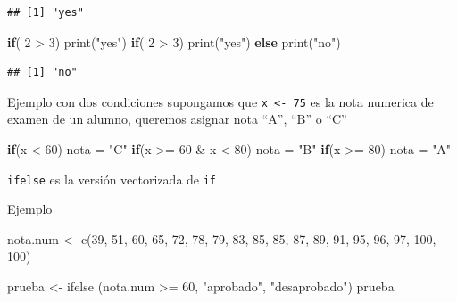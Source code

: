 \documentclass[
]{book}
\newenvironment{Shaded}{\begin{snugshade}}{\end{snugshade}}
\newcommand{\ControlFlowTok}[1]{\textcolor[rgb]{0.13,0.29,0.53}{\textbf{#1}}}
\newcommand{\DecValTok}[1]{\textcolor[rgb]{0.00,0.00,0.81}{#1}}
\newcommand{\FunctionTok}[1]{\textcolor[rgb]{0.00,0.00,0.00}{#1}}
\newcommand{\NormalTok}[1]{#1}
\newcommand{\OtherTok}[1]{\textcolor[rgb]{0.56,0.35,0.01}{#1}}
\newcommand{\SpecialCharTok}[1]{\textcolor[rgb]{0.00,0.00,0.00}{#1}}
\newcommand{\StringTok}[1]{\textcolor[rgb]{0.31,0.60,0.02}{#1}}
\begin{document}
\begin{verbatim}
## [1] "yes"
\end{verbatim}

\begin{Shaded}
\begin{Highlighting}[]
\ControlFlowTok{if}\NormalTok{( }\DecValTok{2} \SpecialCharTok{\textgreater{}} \DecValTok{3}\NormalTok{) }\FunctionTok{print}\NormalTok{(}\StringTok{"yes"}\NormalTok{)}
\ControlFlowTok{if}\NormalTok{( }\DecValTok{2} \SpecialCharTok{\textgreater{}} \DecValTok{3}\NormalTok{) }\FunctionTok{print}\NormalTok{(}\StringTok{"yes"}\NormalTok{) }\ControlFlowTok{else} \FunctionTok{print}\NormalTok{(}\StringTok{"no"}\NormalTok{)}
\end{Highlighting}
\end{Shaded}

\begin{verbatim}
## [1] "no"
\end{verbatim}

Ejemplo con dos condiciones
supongamos que \texttt{x\ \textless{}-\ 75} es la nota numerica de examen de un alumno, queremos asignar nota ``A'', ``B'' o ``C''

\begin{Shaded}
\begin{Highlighting}[]
\ControlFlowTok{if}\NormalTok{(x }\SpecialCharTok{\textless{}} \DecValTok{60}\NormalTok{) nota }\OtherTok{=} \StringTok{"C"}
\ControlFlowTok{if}\NormalTok{(x }\SpecialCharTok{\textgreater{}=} \DecValTok{60} \SpecialCharTok{\&}\NormalTok{ x }\SpecialCharTok{\textless{}} \DecValTok{80}\NormalTok{) nota }\OtherTok{=} \StringTok{"B"}
\ControlFlowTok{if}\NormalTok{(x }\SpecialCharTok{\textgreater{}=}  \DecValTok{80}\NormalTok{) nota }\OtherTok{=} \StringTok{"A"}
\end{Highlighting}
\end{Shaded}

\texttt{ifelse} es la versión vectorizada de \texttt{if}

Ejemplo

\begin{Shaded}
\begin{Highlighting}[]
\NormalTok{nota.num }\OtherTok{\textless{}{-}} \FunctionTok{c}\NormalTok{(}\DecValTok{39}\NormalTok{, }\DecValTok{51}\NormalTok{, }\DecValTok{60}\NormalTok{, }\DecValTok{65}\NormalTok{, }\DecValTok{72}\NormalTok{, }\DecValTok{78}\NormalTok{, }\DecValTok{79}\NormalTok{, }\DecValTok{83}\NormalTok{, }\DecValTok{85}\NormalTok{, }\DecValTok{85}\NormalTok{, }\DecValTok{87}\NormalTok{, }\DecValTok{89}\NormalTok{, }\DecValTok{91}\NormalTok{, }\DecValTok{95}\NormalTok{, }\DecValTok{96}\NormalTok{, }\DecValTok{97}\NormalTok{, }\DecValTok{100}\NormalTok{, }\DecValTok{100}\NormalTok{)}

\NormalTok{prueba }\OtherTok{\textless{}{-}} \FunctionTok{ifelse}\NormalTok{ (nota.num }\SpecialCharTok{\textgreater{}=} \DecValTok{60}\NormalTok{, }\StringTok{"aprobado"}\NormalTok{, }\StringTok{"desaprobado"}\NormalTok{)}
\NormalTok{prueba}
\end{Highlighting}
\end{Shaded}
\end{document}
